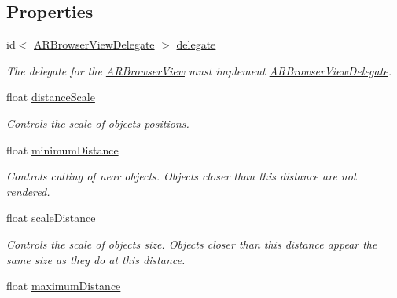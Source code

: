 \subsection*{\-Properties}
\begin{DoxyCompactItemize}
\item 
\hypertarget{interface_a_r_browser_view_ac71040f5d7529f5d1585f774524e6e48}{
id$<$ \hyperlink{protocol_a_r_browser_view_delegate-p}{\-A\-R\-Browser\-View\-Delegate} $>$ \hyperlink{interface_a_r_browser_view_ac71040f5d7529f5d1585f774524e6e48}{delegate}}
\label{interface_a_r_browser_view_ac71040f5d7529f5d1585f774524e6e48}

\begin{DoxyCompactList}\small\item\em \-The delegate for the \hyperlink{interface_a_r_browser_view}{\-A\-R\-Browser\-View} must implement \hyperlink{protocol_a_r_browser_view_delegate-p}{\-A\-R\-Browser\-View\-Delegate}. \end{DoxyCompactList}\item 
float \hyperlink{interface_a_r_browser_view_a91aef66437e470e8f51b90f5f2ec613c}{distance\-Scale}
\begin{DoxyCompactList}\small\item\em \-Controls the scale of objects positions. \end{DoxyCompactList}\item 
\hypertarget{interface_a_r_browser_view_a4831f23b6b057d032491050a2dd826be}{
float \hyperlink{interface_a_r_browser_view_a4831f23b6b057d032491050a2dd826be}{minimum\-Distance}}
\label{interface_a_r_browser_view_a4831f23b6b057d032491050a2dd826be}

\begin{DoxyCompactList}\small\item\em \-Controls culling of near objects. \-Objects closer than this distance are not rendered. \end{DoxyCompactList}\item 
\hypertarget{interface_a_r_browser_view_a868f431ba30b0442d8dd7deab2569205}{
float \hyperlink{interface_a_r_browser_view_a868f431ba30b0442d8dd7deab2569205}{scale\-Distance}}
\label{interface_a_r_browser_view_a868f431ba30b0442d8dd7deab2569205}

\begin{DoxyCompactList}\small\item\em \-Controls the scale of objects size. \-Objects closer than this distance appear the same size as they do at this distance. \end{DoxyCompactList}\item 
\hypertarget{interface_a_r_browser_view_a3828caf0a7d28ba8e9417088ce4e736c}{
float \hyperlink{interface_a_r_browser_view_a3828caf0a7d28ba8e9417088ce4e736c}{maximum\-Distance}}
\label{interface_a_r_browser_view_a3828caf0a7d28ba8e9417088ce4e736c}


\end{DoxyCompactItemize}
